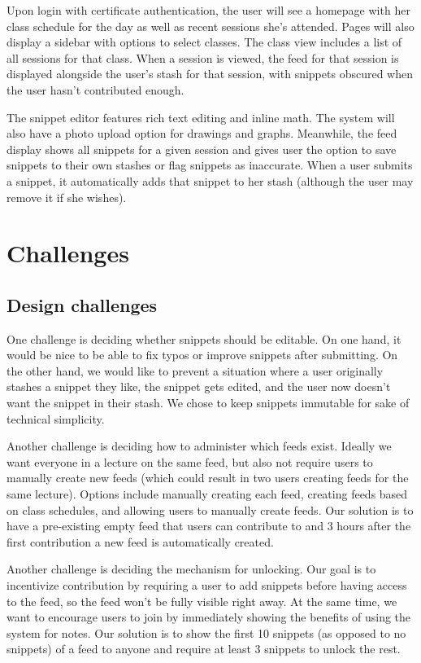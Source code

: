\documentclass{article}
\begin{document}
\newpage

Upon login with certificate authentication, the user will see a homepage with her class schedule for the day as well as recent sessions she's attended. Pages will also display a sidebar with options to select classes. The class view includes a list of all sessions for that class. When a session is viewed, the feed for that session is displayed alongside the user's stash for that session, with snippets obscured when the user hasn't contributed enough.

The snippet editor features rich text editing and inline math. The system will also have a photo upload option for drawings and graphs. Meanwhile, the feed display shows all snippets for a given session and gives user the option to save snippets to their own stashes or flag snippets as inaccurate. When a user submits a snippet, it automatically adds that snippet to her stash (although the user may remove it if she wishes). 

\section*{Challenges}
\subsection*{Design challenges}
One challenge is deciding whether snippets should be editable. On one hand, it would be nice to be able to fix typos or improve snippets after submitting. On the other hand, we would like to prevent a situation where a user originally stashes a snippet they like, the snippet gets edited, and the user now doesn't want the snippet in their stash. We chose to keep snippets immutable for sake of technical simplicity.

Another challenge is deciding how to administer which feeds exist. Ideally we want everyone in a lecture on the same feed, but also not require users to manually create new feeds (which could result in two users creating feeds for the same lecture). Options include manually creating each feed, creating feeds based on class schedules, and allowing users to manually create feeds. Our solution is to have a pre-existing empty feed that users can contribute to and 3 hours after the first contribution a new feed is automatically created.

Another challenge is deciding the mechanism for unlocking. Our goal is to incentivize contribution by requiring a user to add snippets before having access to the feed, so the feed won't be fully visible right away. At the same time, we want to encourage users to join by immediately showing the benefits of using the system for notes. Our solution is to show the first 10 snippets (as opposed to no snippets) of a feed to anyone and require at least 3 snippets to unlock the rest.
\end{document}
